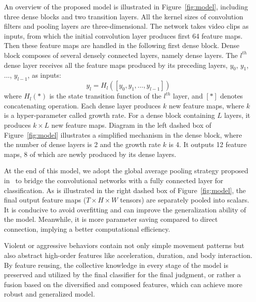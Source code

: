 \documentclass[10pt,twocolumn,letterpaper]{article}
\begin{document}
An overview of the proposed model is illustrated in Figure~\ref{fig:model}, including three dense blocks and two transition layers. 
All the kernel sizes of convolution filters and pooling layers are three-dimensional. 
The network takes video clips as inputs, from which the initial convolution layer produces first 64 feature maps. 
Then these feature maps are handled in the following first dense block. 
Dense block composes of several densely connected layers, namely dense layers.
The $l^{th}$ dense layer receives all the feature maps produced by its preceding layers, $y_0$, $y_1$, $\ldots$, $y_{l-1}$, as inputs:
\begin{equation}
\label{eq:densenet}
y_l = H_l\left([y_0, y_1, \ldots, y_{l-1}]\right)
\end{equation}
where $H_l(*)$ is the state transition function of the $l^{th}$ layer, and $[*]$ denotes concatenating operation.
Each dense layer produces $k$ new feature maps, where $k$ is a hyper-parameter called growth rate. 
For a dense block containing $L$ layers, it produces $k \times L$ new feature maps.
Diagram in the left dashed box of Figure~\ref{fig:model} illustrates a simplified mechanism in the dense block, where the number of dense layers is 2 and the growth rate $k$ is 4.
It outputs 12 feature maps, 8 of which are newly produced by its dense layers.

At the end of this model, we adopt the global average pooling strategy proposed in~\cite{NinN} to bridge the convolutional networks with a fully connected layer for classification.
As is illustrated in the right dashed box of Figure~\ref{fig:model}, the final output feature maps ($T \times H \times W$ tensors) are separately pooled into scalars.
It is conducive to avoid overfitting and can improve the generalization ability of the model. 
Meanwhile, it is more parameter saving compared to direct connection, implying a better computational efficiency.

Violent or aggressive behaviors contain not only simple movement patterns but also abstract high-order features like acceleration, duration, and body interaction.  
By feature reusing, the collective knowledge in every stage of the model is preserved and utilized by the final classifier for the final judgment, or rather a fusion based on the diversified and composed features, which can achieve more robust and generalized model. 

\end{document}
